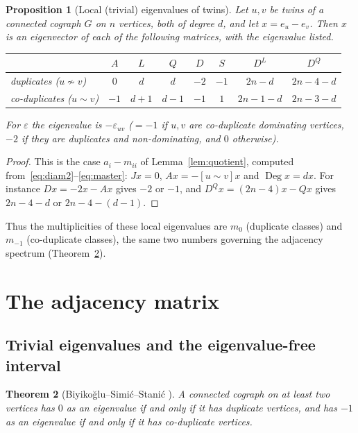 \documentclass[11pt]{article}
\theoremstyle{plain}
\newtheorem{theorem}{Theorem}[section]
\newtheorem{proposition}[theorem]{Proposition}
\theoremstyle{definition}
\theoremstyle{remark}
\DeclareMathOperator{\Deg}{Deg}
\begin{document}
	\begin{proposition}[Local (trivial) eigenvalues of twins]
		\label{prop:local}
		Let $u,v$ be twins of a connected cograph $G$ on $n$ vertices, both of degree $d$, and let $x=e_u-e_v$. Then $x$ is an eigenvector of each of the following matrices, with the eigenvalue listed.
		\begin{center}
			\begin{tabular}{lccccccc}
				\toprule
				& $A$ & $L$ & $Q$ & $D$ & $S$ & $D^L$ & $D^Q$\\
				\midrule
				duplicates ($u\not\sim v$) & $0$ & $d$ & $d$ & $-2$ & $-1$ & $2n-d$ & $2n-4-d$\\
				co-duplicates ($u\sim v$) & $-1$ & $d+1$ & $d-1$ & $-1$ & $1$ & $2n-1-d$ & $2n-3-d$\\
				\bottomrule
			\end{tabular}
		\end{center}
		For $\varepsilon$ the eigenvalue is $-\varepsilon_{uv}$ ($=-1$ if $u,v$ are co-duplicate dominating vertices, $-2$ if they are duplicates and non-dominating, and $0$ otherwise).
	\end{proposition}
	\begin{proof}
		This is the case $a_i-m_{ii}$ of Lemma~\ref{lem:quotient}, computed from~\eqref{eq:diam2}--\eqref{eq:master}: $Jx=0$, $Ax=-[u\sim v]x$ and $\Deg x=dx$. For instance $Dx=-2x-Ax$ gives $-2$ or $-1$, and $D^Qx=(2n-4)x-Qx$ gives $2n-4-d$ or $2n-4-(d-1)$. \qedhere
	\end{proof}
	
	Thus the multiplicities of these local eigenvalues are $m_0$ (duplicate classes) and $m_{-1}$ (co-duplicate classes), the same two numbers governing the adjacency spectrum (Theorem~\ref{thm:bss}).
	
	
	\section{The adjacency matrix}
	\label{sec:adjacency}
	
	\subsection{Trivial eigenvalues and the eigenvalue-free interval}
	\label{sec:general}
	
	\begin{theorem}[Biyikoğlu--Simić--Stanić \cite{BiyikogluSimicStanic2011}]
		\label{thm:bss}
		A connected cograph on at least two vertices has $0$ as an eigenvalue if and only if it has duplicate vertices, and has $-1$ as an eigenvalue if and only if it has co-duplicate vertices.
	\end{theorem}
	
\end{document}
